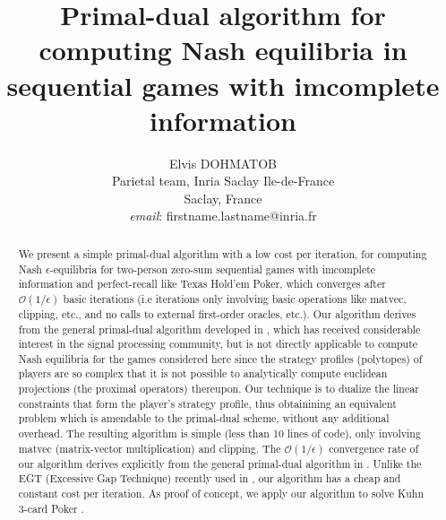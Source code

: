 \documentclass{article} %
\author{
Elvis DOHMATOB
\\
Parietal team, Inria Saclay Ile-de-France\\
Saclay, France\\
\textit{email}: firstname.lastname@inria.fr}
\title{Primal-dual algorithm for computing Nash equilibria in
sequential games with imcomplete information
}
\begin{document}
\maketitle

\begin{abstract}
We present a simple primal-dual algorithm with a low cost per iteration, for computing Nash $\epsilon$-equilibria for two-person zero-sum sequential games with imcomplete information and perfect-recall like Texas Hold'em Poker, which converges after $\mathcal{O}(1/\epsilon)$ basic iterations (i.e iterations only involving basic operations like matvec, clipping, etc., and no calls to external first-order oracles, etc.). %
Our algorithm derives from the general primal-dual algorithm developed
in \cite{chambolle2010}, which has received considerable interest in the signal processing community, but is not directly applicable to compute Nash equilibria for the games considered here since the strategy profiles (polytopes) of players are so complex that it is not possible
 to analytically compute
euclidean
 projections (the proximal operators) thereupon.
Our technique is to dualize the linear constraints that form the player's strategy profile, thus obtainining an equivalent problem which is amendable to the primal-dual scheme, without any additional overhead. The resulting algorithm is simple (less than 10 lines of code), only involving matvec (matrix-vector multiplication) and clipping. The $\mathcal{O}(1/\epsilon)$ convergence rate of our algorithm derives explicitly from the general primal-dual algorithm in \cite{chambolle2010}. Unlike the EGT (Excessive Gap Technique) recently used in \cite{hoda2010smoothing, gilpinfirst}, our algorithm has a cheap and constant cost per iteration. As proof of concept, we apply our algorithm to solve Kuhn 3-card Poker \cite{kuhn}.
\end{abstract}
\end{document}
